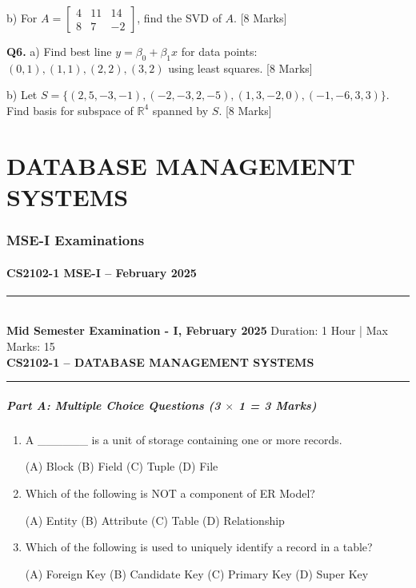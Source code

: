 \documentclass[11pt,a4paper]{article}
\newcommand{\examheader}[4]{
\noindent\rule{\textwidth}{0.5pt}\\
\textbf{#1} \hfill Duration: #3 | Max Marks: #4\\
\textbf{#2}\\
\rule{\textwidth}{0.5pt}
\vspace{0.2cm}
}
\begin{document}
b) For $A = \begin{bmatrix} 4 & 11 & 14 \\ 8 & 7 & -2 \end{bmatrix}$, find the SVD of $A$. \hfill [8 Marks]

\textbf{Q6.} a) Find best line $y = \beta_0 + \beta_1 x$ for data points: $(0, 1), (1, 1), (2, 2), (3, 2)$ using least squares. \hfill [8 Marks]

b) Let $S = \{(2, 5, -3, -1), (-2, -3, 2, -5), (1, 3, -2, 0), (-1, -6, 3, 3)\}$. Find basis for subspace of $\mathbb{R}^4$ spanned by $S$. \hfill [8 Marks]

\newpage
\part{DATABASE MANAGEMENT SYSTEMS}

\section{MSE-I Examinations}

\subsection{CS2102-1 MSE-I -- February 2025}
\examheader{Mid Semester Examination - I, February 2025}{CS2102-1 -- DATABASE MANAGEMENT SYSTEMS}{1 Hour}{15}

\subsubsection*{Part A: Multiple Choice Questions (3 $\times$ 1 = 3 Marks)}

\begin{enumerate}
\item A \_\_\_\_\_\_ is a unit of storage containing one or more records.

(A) Block \quad (B) Field \quad (C) Tuple \quad (D) File

\item Which of the following is NOT a component of ER Model?

(A) Entity \quad (B) Attribute \quad (C) Table \quad (D) Relationship

\item Which of the following is used to uniquely identify a record in a table?

(A) Foreign Key \quad (B) Candidate Key \quad (C) Primary Key \quad (D) Super Key
\end{enumerate}
\end{document}
